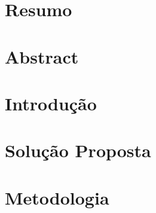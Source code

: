 % 

\chapter{Resumo} %


\chapter{Abstract} %




\chapter{Introdução} %


\chapter{Solução Proposta} %

\label{cha:solucao}


\chapter{Metodologia}

